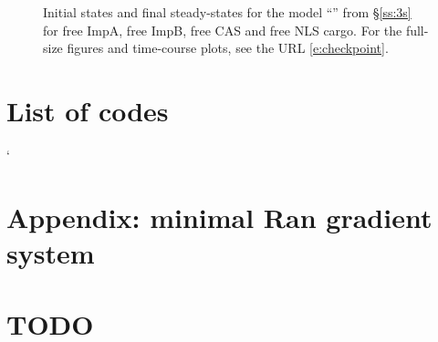\documentclass[12pt,notitlepage]{article}
\begin{document}
\begin{figure}[!p]
	\vspace{\baselineskip}
		
	\caption{%
		Initial states and final steady-states for the model 
		``'' from \S\ref{ss:3s}
		for 
		free ImpA, free ImpB, free CAS and free NLS cargo.
		For the full-size figures and time-course plots, see the URL \eqref{e:checkpoint}.
	}
	\label{f:app:3s-plot-ss}
\end{figure}




%





\renewcommand*{\bibfont}{\normalfont\small}
\printbibliography %


\section*{List of codes}

\begin{center}
\SHOWCODES
\end{center}



`\clearpage

\section{Appendix: minimal Ran gradient system} \label{s:app:gsr-ran}









\clearpage

\section{TODO}
\SHOWTODOS
\end{document}
